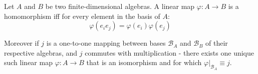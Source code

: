\begin{theorem}
    Let $A$ and $B$ be two finite-dimensional algebras.
	A linear map $\varphi: A \to B$ is a homomorphism iff for every element in the basis of $A$:
	\[\varphi(e_ie_j) = \varphi(e_i)\varphi(e_j)\]

	Moreover if $j$ is a one-to-one mapping between bases $\mathcal{B}_A$ and $\mathcal{B}_B$ of their respective algebras, and $j$ commutes with multiplication - there exists one unique such linear map $\varphi: A \to B$ that is an isomorphism and for which $\varphi|_{\mathcal{B}_A} \equiv j$.
\end{theorem}
